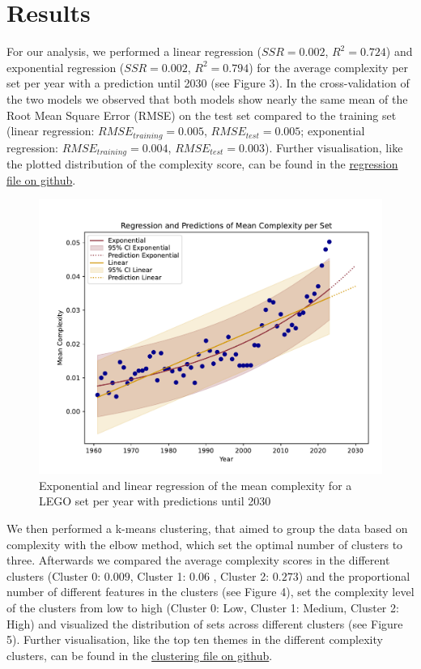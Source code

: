 \documentclass{article}
\theoremstyle{plain}
\theoremstyle{definition}
\theoremstyle{remark}
\begin{document}
\section{Results}\label{sec:results}
For our analysis, we performed a linear regression ($SSR = 0.002$, $R^2= 0.724$) and exponential regression ($SSR = 0.002$, $R^2= 0.794$) for the average complexity per set per year with a prediction until 2030 (see Figure 3). In the cross-validation of the two models we observed that both models show nearly the same mean of the Root Mean Square Error (RMSE) on the test set compared to the training set (linear regression: $RMSE_{training} = 0.005$, $RMSE_{test} = 0.005$; exponential regression: $RMSE_{training} = 0.004$, $RMSE_{test} = 0.003$). Further visualisation, like the plotted distribution of the complexity score, can be found in the \href{https://github.com/eddiebeach99/Data_Literacy/blob/main/Analysis/complexity_regression.ipynb}{regression file on github}.
\begin{figure}[ht]
 \vskip 0.2in
 \begin{center}
 \centerline{\includegraphics[width=\columnwidth]{../Images/Regressions.pdf}}
\caption{Exponential and linear regression of the mean complexity for a LEGO set per year with predictions until 2030}
\label{icml-historical}
 \end{center}
 \vskip -0.2in
\end{figure}
We then performed a k-means clustering, that aimed to group the data based on complexity with the elbow method, which set the optimal number of clusters to three. Afterwards we compared the average complexity scores in the different clusters (Cluster 0: $0.009$, Cluster 1: $0.06$ , Cluster 2: $0.273$) and the proportional number of different features in the clusters (see Figure 4), set the complexity level of the clusters from low to high (Cluster 0: Low, Cluster 1: Medium, Cluster 2: High) and visualized the distribution of sets across different clusters (see Figure 5). Further visualisation, like the top ten themes in the different complexity clusters, can be found in the \href{https://github.com/eddiebeach99/Data_Literacy/blob/main/Analysis/clustering.ipynb}{clustering file on github}.
\end{document}
